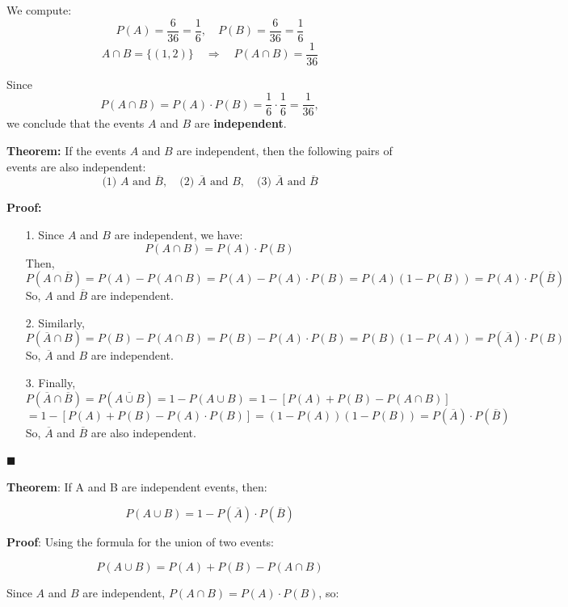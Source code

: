 \documentclass[twoside]{book}
\begin{document}
We compute:
\[
P(A) = \frac{6}{36} = \frac{1}{6}, \quad P(B) = \frac{6}{36} = \frac{1}{6}
\]
\[
A \cap B = \{(1,2)\} \quad \Rightarrow \quad P(A \cap B) = \frac{1}{36}
\]

Since
\[
P(A \cap B) = P(A) \cdot P(B) = \frac{1}{6} \cdot \frac{1}{6} = \frac{1}{36},
\]
we conclude that the events \( A \) and \( B \) are \textbf{independent}.

\begin{textbox}
\textbf{Theorem:}  
If the events \( A \) and \( B \) are independent, then the following pairs of events are also independent:
\[
\text{(1) } A \text{ and } \overline{B}, \quad \text{(2) } \overline{A} \text{ and } B, \quad \text{(3) } \overline{A} \text{ and } \overline{B}
\]
\end{textbox}
\textbf{Proof:}

\begin{itemize}
  \item[1.] Since \( A \) and \( B \) are independent, we have:
  \[
  P(A \cap B) = P(A)\cdot P(B)
  \]
  Then,
  \[
  P(A \cap \overline{B}) = P(A) - P(A \cap B) = P(A) - P(A)\cdot P(B) = P(A)(1 - P(B)) = P(A)\cdot P(\overline{B})
  \]
  So, \( A \) and \( \overline{B} \) are independent.

  \item[2.] Similarly,
  \[
  P(\overline{A} \cap B)  = P(B) - P(A \cap B) = P(B) - P(A)\cdot P(B) = P(B)(1 - P(A)) = P(\overline{A})\cdot P(B)
  \]
  So, \( \overline{A} \) and \( B \) are independent.

  \item[3.] Finally,
  \[
  P(\overline{A} \cap \overline{B}) = P(\overline{A \cup B}) = 1 - P(A \cup B) = 1 - [P(A) + P(B) - P(A \cap B)]
  \]
  \[
  = 1 - [P(A) + P(B) - P(A)\cdot P(B)] = (1 - P(A))(1 - P(B)) = P(\overline{A})\cdot P(\overline{B})
  \]
  So, \( \overline{A} \) and \( \overline{B} \) are also independent.
\end{itemize}
\hfill\(\blacksquare\)

\begin{textbox}
    \textbf{Theorem}: If A and B are independent events, then:

\[
P(A \cup B) = 1 - P(\overline{A})\cdot P(\overline{B})
\]
\end{textbox}

\textbf{Proof}: Using the formula for the union of two events:

\[
P(A \cup B) = P(A) + P(B) - P(A \cap B)
\]

Since \( A \) and \( B \) are independent, \( P(A \cap B) = P(A)\cdot P(B) \), so:
\end{document}
